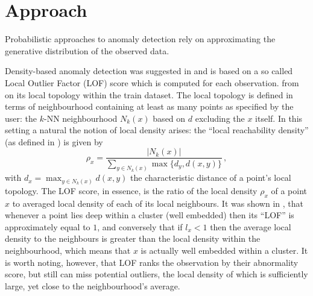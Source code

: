 \documentclass{extarticle}
\begin{document}

\section{Approach} %
\label{sec:approach}

Probabilistic approaches to anomaly detection rely on approximating the generative
distribution of the observed data.

Density-based anomaly detection was suggested in \cite{breunig2000} and is based
on a so called Local Outlier Factor (LOF) score which is computed for each observation.
from on its local topology within the train dataset. The local topology is defined
in terms of neighbourhood containing at least as many points as specified by the
user: the $k$-NN neighbourhood $N_k(x)$ based on $d$ excluding the $x$ itself. In
this setting a natural the notion of local density arises: the ``local reachability
density'' (as defined in \cite{breunig2000}) is given by
\begin{equation*}
    \rho_x = \frac{|N_k(x)|}{\sum_{y\in N_k(x)} \max\{d_y, d(x,y)\}} \,,
\end{equation*}
with $d_x = \max_{y\in N_k(x)} d(x, y)$ the characteristic distance of a point's
local topology. The LOF score, in essence, is the ratio of the local density $\rho_x$
of a point $x$ to averaged local density of each of its local neighbours. It was
shown in \cite{breunig2000}, that whenever a point lies deep within a cluster (well
embedded) then its ``LOF'' is approximately equal to $1$, and conversely that if
$l_x < 1$ then the average local density to the neighbours is greater than the
local density within the neighbourhood, which means that $x$ is actually well embedded
within a cluster. It is worth noting, however, that LOF ranks the observation by
their abnormality score, but still can miss potential outliers, the local density
of which is sufficiently large, yet close to the neighbourhood's average.
\end{document}
